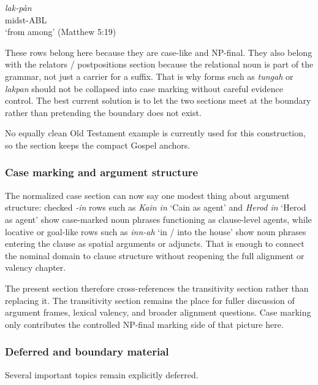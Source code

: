 \documentclass[
  11pt,
  a4paper,
]{article}
\newcommand{\tdim}[1]{\textit{#1}}
\newcommand{\tdimword}[1]{\textit{#1}}
\renewcommand{\textsc}[1]{{\footnotesize\MakeUppercase{#1}}}
\newcommand{\glossquote}[1]{`#1'}
\begin{document}
\begin{exe}
\ex \label{ex:case-relator-lakpan}
\gll \tdimword{lak-pàn} \\
     midst-\textsc{abl} \\
\glt \glossquote{from among} (Matthew 5:19)
\end{exe}

These rows belong here because they are case-like and NP-final. They
also belong with the relators / postpositions section because the
relational noun is part of the grammar, not just a carrier for a suffix.
That is why forms such as \tdim{tungah} or \tdim{lakpan} should not be
collapsed into case marking without careful evidence control. The best
current solution is to let the two sections meet at the boundary rather
than pretending the boundary does not exist.

No equally clean Old Testament example is currently used for this
construction, so the section keeps the compact Gospel anchors.

\subsubsection{Case marking and argument
structure}\label{case-marking-and-argument-structure}

The normalized case section can now say one modest thing about argument
structure: checked \tdim{-in} rows such as \tdim{Kain in}
\glossquote{Cain as agent} and \tdim{Herod in}
\glossquote{Herod as agent} show case-marked noun phrases functioning as
clause-level agents, while locative or goal-like rows such as
\tdim{inn-ah} \glossquote{in / into the house} show noun phrases
entering the clause as spatial arguments or adjuncts. That is enough to
connect the nominal domain to clause structure without reopening the
full alignment or valency chapter.

The present section therefore cross-references the transitivity section
rather than replacing it. The transitivity section remains the place for
fuller discussion of argument frames, lexical valency, and broader
alignment questions. Case marking only contributes the controlled
NP-final marking side of that picture here.

\subsubsection{Deferred and boundary
material}\label{deferred-and-boundary-material}

Several important topics remain explicitly deferred.
\end{document}
